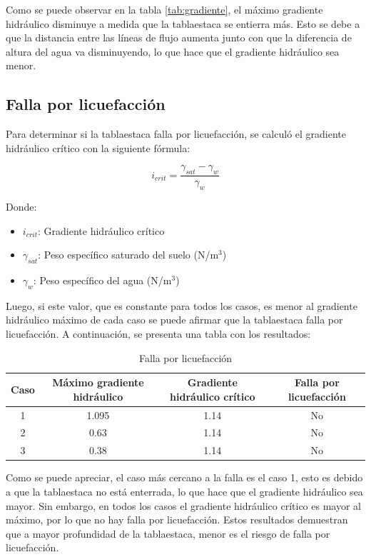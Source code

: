 \documentclass{article}
\begin{document}
Como se puede observar en la tabla \ref{tab:gradiente}, el máximo gradiente hidráulico disminuye a medida que la tablaestaca se entierra más. Esto se debe a que la distancia entre las líneas de flujo aumenta junto con que la diferencia de altura del agua va disminuyendo, lo que hace que el gradiente hidráulico sea menor. 

\subsection{Falla por licuefacción}

Para determinar si la tablaestaca falla por licuefacción, se calculó el gradiente hidráulico crítico con la siguiente fórmula:

\begin{equation}
  i_{crit} = \frac{\gamma_{sat}-\gamma_w}{\gamma_w} 
\end{equation}

Donde:
\begin{itemize}
    \item $i_{crit}$: Gradiente hidráulico crítico
    \item $\gamma_{sat}$: Peso específico saturado del suelo (N/m$^3$)
    \item $\gamma_w$: Peso específico del agua (N/m$^3$)  
\end{itemize}
Luego, si este valor, que es constante para todos los casos, es menor al gradiente hidráulico máximo de cada caso se puede afirmar que la tablaestaca falla por licuefacción. A continuación, se presenta una tabla con los resultados:

\begin{table}[h!]
  \centering
  \begin{tabular}{cccc}
    \hline
    \textbf{Caso} & \textbf{Máximo gradiente hidráulico}& \textbf{Gradiente hidráulico crítico} &\textbf{Falla por licuefacción} \\
    \hline
    1 &1.095 & 1.14 &No \\
    2 &0.63  & 1.14 &No \\
    3 &0.38  & 1.14 &No \\
    \hline
  \end{tabular}
  \caption{Falla por licuefacción}
  \label{tab:licuefaccion}
\end{table}

Como se puede apreciar, el caso más cercano a la falla es el caso 1, esto es debido a que la tablaestaca no está enterrada, lo que hace que el gradiente hidráulico sea mayor. Sin embargo, en todos los casos el gradiente hidráulico crítico es mayor al máximo, por lo que no hay falla por licuefacción. Estos resultados demuestran que a mayor profundidad de la tablaestaca, menor es el riesgo de falla por licuefacción.
\end{document}
